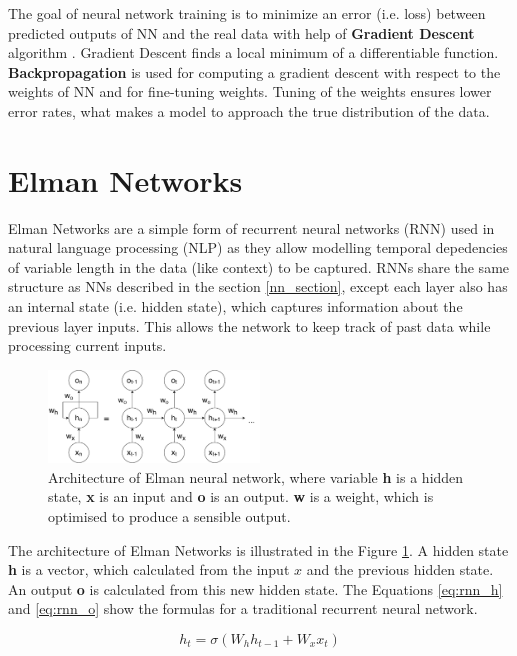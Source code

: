 The goal of neural network training is to minimize an error (i.e. loss) between predicted outputs of NN and the real data with help of \textbf{Gradient Descent} algorithm \cite{lemarechal2012cauchy}. Gradient Descent finds a local minimum of a differentiable function. \textbf{Backpropagation} \cite{rumelhart1986learning} is used for computing a gradient descent with respect to the weights of NN and for fine-tuning weights. Tuning of the weights ensures lower error rates, what makes a model to approach the true distribution of the data. 

\section{Elman Networks} \label{rnn_section}
Elman Networks are a simple form of recurrent neural networks (RNN) used in natural language processing (NLP) as they allow modelling temporal depedencies of variable length in the data (like context) to be captured. RNNs share the same structure as NNs described in the section \ref{nn_section}, except each layer also has an internal state (i.e. hidden state), which captures information about the previous layer inputs. This allows the network to keep track of past data while processing current inputs.

\begin{figure}[hbt]
  \centering
  \includegraphics[width=0.5\textwidth]{figures/rnn.pdf}
  \caption{Architecture of Elman neural network, where variable \textbf{h} is a hidden state, \textbf{x} is an input and \textbf{o} is an output. \textbf{w} is a weight, which is optimised to produce a sensible output.}
  \label{rnn}
\end{figure}

The architecture of Elman Networks is illustrated in the Figure \ref{rnn}. A hidden state \textbf{h} is a vector, which calculated from the input $x$ and the previous hidden state. An output \textbf{o} is calculated from this new hidden state. 
The Equations \ref{eq:rnn_h} and \ref{eq:rnn_o} show the formulas for a traditional recurrent neural network.

\begin{equation} \label{eq:rnn_h}
h_t = \sigma(W_hh_{t-1} + W_xx_t)
\end{equation}

